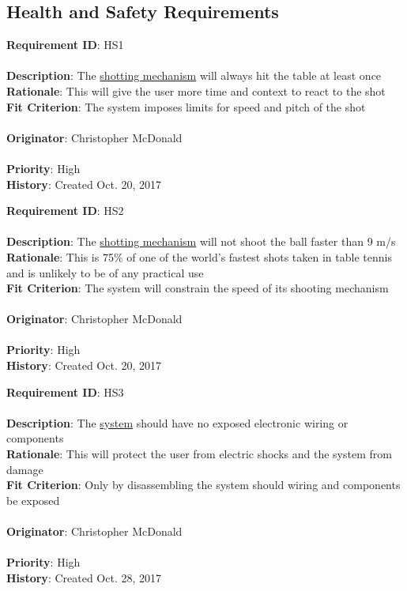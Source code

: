 \documentclass[11pt]{article}
\begin{document}
\subsection{Health and Safety Requirements}
\begin{framed}
	\noindent\textbf{Requirement ID}: HS1 \hfill\\\\
	\noindent\textbf{Description}: The \hyperref[sec:definitions]{shotting mechanism} will always hit the table at least once  \\
	\textbf{Rationale}: This will give the user more time and context to react to the shot \\
	\textbf{Fit Criterion}: The system imposes limits for speed and pitch of the shot \\\\
	\textbf{Originator}: Christopher McDonald \\\\
	\textbf{Priority}: High \hfill \\
	\noindent\textbf{History}: Created Oct. 20, 2017
\end{framed}

\begin{framed}
	\noindent\textbf{Requirement ID}: HS2 \hfill\\\\
	\noindent\textbf{Description}: The \hyperref[sec:definitions]{shotting mechanism} will not shoot the ball faster than 9 m/s \\
	\textbf{Rationale}: This is 75\% of one of the world's fastest shots taken in table tennis and is unlikely to be of any practical use\\
	\textbf{Fit Criterion}: The system will constrain the speed of its shooting mechanism \\\\
	\textbf{Originator}: Christopher McDonald \\\\
	\textbf{Priority}: High \hfill \\
	\noindent\textbf{History}: Created Oct. 20, 2017
\end{framed}

\begin{framed}
	\noindent\textbf{Requirement ID}: HS3 \hfill\\\\
	\noindent\textbf{Description}: The \hyperref[sec:definitions]{system} should have no exposed electronic wiring or components \\
	\textbf{Rationale}: This will protect the user from electric shocks and the system from damage \\
	\textbf{Fit Criterion}: Only by disassembling the system should wiring and components be exposed \\\\
	\textbf{Originator}: Christopher McDonald \\\\
	\textbf{Priority}: High \hfill \\
	\noindent\textbf{History}: Created Oct. 28, 2017
\end{framed}
\end{document}
